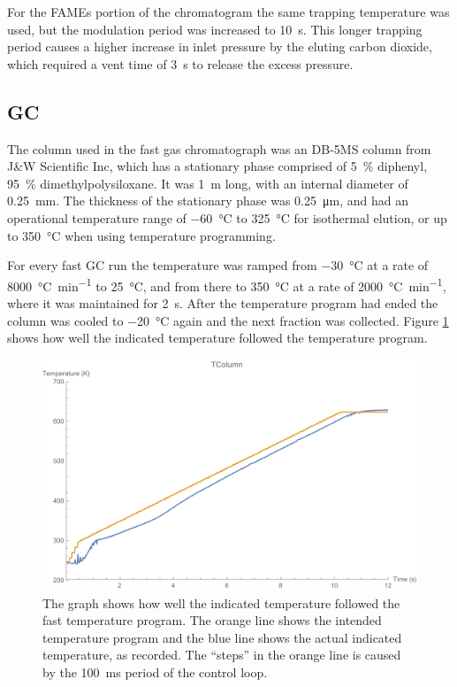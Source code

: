 For the FAMEs portion of the chromatogram the same trapping temperature was
used, but the modulation period was increased to \SI{10}{\second}. This longer
trapping period causes a higher increase in inlet pressure by the eluting carbon
dioxide, which required a vent time of \SI{3}{\second} to release the excess
pressure.

\subsection{GC}

The column used in the fast gas chromatograph was an DB-5MS column from J\&W
Scientific Inc, which has a stationary phase comprised of \SI{5}{\percent}
diphenyl, \SI{95}{\percent} di\-meth\-yl\-poly\-si\-lox\-ane. It was \SI{1}{\metre} long,
with an internal diameter of \SI{0.25}{\milli\metre}. The thickness of the
stationary phase was \SI{0.25}{\micro\metre}, and had an operational temperature
range of \SI{-60}{\celsius} to \SI{325}{\celsius} for isothermal elution, or up
to \SI{350}{\celsius} when using temperature programming.

For every fast GC run the temperature was ramped from \SI{-30}{\celsius} at a
rate of \SI{8000}{\celsius\per\minute} to \SI{25}{\celsius}, and from there to
\SI{350}{\celsius} at a rate of \SI{2000}{\celsius\per\minute}, where it was
maintained for \SI{2}{s}. After the temperature program had ended the column was
cooled to \SI{-20}{\celsius} again and the next fraction was collected. Figure
\ref{fig:Setpoint_Following} shows how well the indicated temperature followed
the temperature program.

\begin{figure}
	\centering
	\includegraphics[width=\textwidth]{Figures/Setpoint_Following.pdf}
	\decoRule	
	
\caption[The fidelity of a fast GC temperature program]{ The graph shows how
well the indicated temperature followed the fast temperature program. The orange
line shows the intended temperature program and the blue line shows the actual
indicated temperature, as recorded. The ``steps'' in the orange line is caused
by the \SI{100}{\milli\second} period of the control loop.}

	\label{fig:Setpoint_Following} 
\end{figure}


